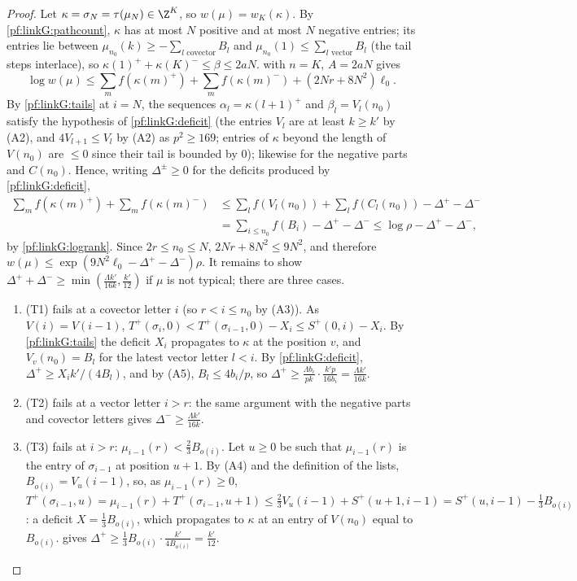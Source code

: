 \begin{proof}
Let $\kappa=\sigma_N=\tau(\mu_N)\in\Z^K$, so $w(\mu)=w_K(\kappa)$. By \cref{pf:linkG:pathcount}, $\kappa$ has at most $N$ positive and at most
$N$ negative entries; its entries lie between $\mu_{n_0}(k)\ge-\sum_{l\text{ covector}}B_l$ and $\mu_{n_0}(1)\le\sum_{l\text{ vector}}B_l$
(the tail steps interlace), so $\kappa(1)^++\kappa(K)^-\le\beta\le2aN$.  with $n=K$, $A=2aN$ gives
\[
\log w(\mu)\le\sum_mf(\kappa(m)^+)+\sum_mf(\kappa(m)^-)+(2Nr+8N^2)\ell_0 .
\]
By \cref{pf:linkG:tails} at $i=N$, the sequences $\alpha_l=\kappa(l+1)^+$ and $\beta_l=V_l(n_0)$ satisfy the hypothesis of
\cref{pf:linkG:deficit} (the entries $V_l$ are at least $k\ge k'$ by (A2), and $4V_{l+1}\le V_l$ by (A2) as $p^2\ge169$; entries of
$\kappa$ beyond the length of $V(n_0)$ are $\le0$ since their tail is bounded by $0$); likewise for the negative parts and
$C(n_0)$. Hence, writing $\Delta^\pm\ge0$ for the deficits produced by \cref{pf:linkG:deficit},
\begin{align*}
\sum_mf(\kappa(m)^+)+\sum_mf(\kappa(m)^-)&\le\sum_lf(V_l(n_0))+\sum_lf(C_l(n_0))-\Delta^+-\Delta^-\\
&=\sum_{i\le n_0}f(B_i)-\Delta^+-\Delta^-\le\log\rho-\Delta^+-\Delta^-,
\end{align*}
by \cref{pf:linkG:logrank}. Since $2r\le n_0\le N$, $2Nr+8N^2\le9N^2$, and therefore $w(\mu)\le\exp(9N^2\ell_0-\Delta^+-\Delta^-)\rho$.
It remains to show $\Delta^++\Delta^-\ge\min(\frac{\Lambda k'}{16k},\frac{k'}{12})$ if $\mu$ is not typical; there are three cases.
\begin{enumerate}[label=(\roman*)]
\item (T1) fails at a covector letter $i$ (so $r<i\le n_0$ by (A3)). As $V(i)=V(i-1)$,
$T^+(\sigma_i,0)<T^+(\sigma_{i-1},0)-X_i\le S^+(0,i)-X_i$. By \cref{pf:linkG:tails} the deficit $X_i$ propagates to $\kappa$ at the
position $v$, and $V_v(n_0)=B_l$ for the latest vector letter $l<i$. By \cref{pf:linkG:deficit}, $\Delta^+\ge X_ik'/(4B_l)$, and by
(A5), $B_l\le4b_i/p$, so $\Delta^+\ge\frac{\Lambda b_i}{pk}\cdot\frac{k'p}{16b_i}=\frac{\Lambda k'}{16k}$.
\item (T2) fails at a vector letter $i>r$: the same argument with the negative parts and covector letters gives
$\Delta^-\ge\frac{\Lambda k'}{16k}$.
\item (T3) fails at $i>r$: $\mu_{i-1}(r)<\frac23B_{o(i)}$. Let $u\ge0$ be such that $\mu_{i-1}(r)$ is the entry of $\sigma_{i-1}$ at position
$u+1$. By (A4) and the definition of the lists, $B_{o(i)}=V_u(i-1)$, so, as $\mu_{i-1}(r)\ge0$,
$T^+(\sigma_{i-1},u)=\mu_{i-1}(r)+T^+(\sigma_{i-1},u+1)\le\frac23V_u(i-1)+S^+(u+1,i-1)=S^+(u,i-1)-\frac13B_{o(i)}$:
a deficit $X=\frac13B_{o(i)}$, which propagates to $\kappa$ at an entry of $V(n_0)$ equal to $B_{o(i)}$.  gives
$\Delta^+\ge\frac13B_{o(i)}\cdot\frac{k'}{4B_{o(i)}}=\frac{k'}{12}$.
\end{enumerate}
\end{proof}

